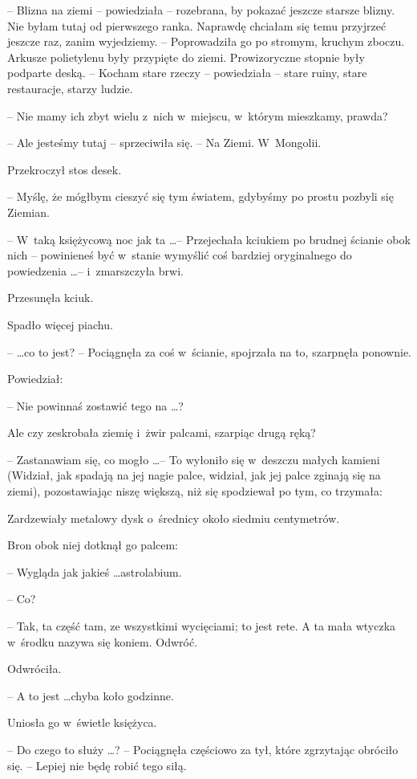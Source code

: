 \documentclass[oneside,polish,11pt,rmheadings]{mwbk}
\begin{document}
-- Blizna na ziemi -- powiedziała -- rozebrana, by pokazać jeszcze starsze blizny. Nie byłam tutaj od pierwszego ranka. Naprawdę chciałam się temu przyjrzeć jeszcze raz, zanim wyjedziemy. -- Poprowadziła go po stromym, kruchym zboczu. Arkusze polietylenu były przypięte do ziemi. Prowizoryczne stopnie były podparte deską. -- Kocham stare rzeczy -- powiedziała -- stare ruiny, stare restauracje, starzy ludzie. 

-- Nie mamy ich zbyt wielu z~nich w~miejscu, w~którym mieszkamy, prawda? 

-- Ale jesteśmy tutaj -- sprzeciwiła się. -- Na Ziemi. W~Mongolii. 

Przekroczył stos desek. 

-- Myślę, że mógłbym cieszyć się tym światem, gdybyśmy po prostu pozbyli się Ziemian. 

-- W~taką księżycową noc jak ta  \ldots  -- Przejechała kciukiem po brudnej ścianie obok nich -- powinieneś być w~stanie wymyślić coś bardziej oryginalnego do powiedzenia \ldots  -- i~zmarszczyła brwi.  

Przesunęła kciuk.  

Spadło więcej piachu. 

--  \ldots  co to jest? -- Pociągnęła za coś w~ścianie, spojrzała na to, szarpnęła ponownie. 

Powiedział: 

-- Nie powinnaś zostawić tego na \ldots ? 

Ale czy zeskrobała ziemię i~żwir palcami, szarpiąc drugą ręką? 

-- Zastanawiam się, co mogło \ldots  -- To wyłoniło się w~deszczu małych kamieni (Widział, jak spadają na jej nagie palce, widział, jak jej palce zginają się na ziemi), pozostawiając niszę większą, niż się spodziewał po tym, co trzymała: 

Zardzewiały metalowy dysk o~średnicy około siedmiu centymetrów. 

Bron obok niej dotknął go palcem: 

-- Wygląda jak jakieś \ldots  astrolabium. 

-- Co? 

-- Tak, ta część tam, ze wszystkimi wycięciami; to jest rete. A ta mała wtyczka w~środku nazywa się koniem. Odwróć.  

Odwróciła. 

-- A to jest \ldots  chyba koło godzinne. 

Uniosła go w~świetle księżyca. 

-- Do czego to służy \ldots ? -- Pociągnęła częściowo za tył, które zgrzytając obróciło się. -- Lepiej nie będę robić tego siłą. 
\end{document}
